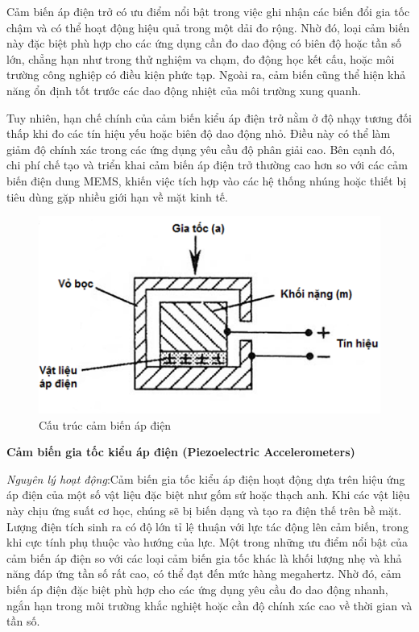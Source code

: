 Cảm biến áp điện trở có ưu điểm nổi bật trong việc ghi nhận các biến đổi gia tốc chậm và có thể hoạt động hiệu quả trong một dải đo rộng. Nhờ đó, loại cảm biến này đặc biệt phù hợp cho các ứng dụng cần đo dao động có biên độ hoặc tần số lớn, chẳng hạn như trong thử nghiệm va chạm, đo động học kết cấu, hoặc môi trường công nghiệp có điều kiện phức tạp. Ngoài ra, cảm biến cũng thể hiện khả năng ổn định tốt trước các dao động nhiệt của môi trường xung quanh.

Tuy nhiên, hạn chế chính của cảm biến kiểu áp điện trở nằm ở độ nhạy tương đối thấp khi đo các tín hiệu yếu hoặc biên độ dao động nhỏ. Điều này có thể làm giảm độ chính xác trong các ứng dụng yêu cầu độ phân giải cao. Bên cạnh đó, chi phí chế tạo và triển khai cảm biến áp điện trở thường cao hơn so với các cảm biến điện dung MEMS, khiến việc tích hợp vào các hệ thống nhúng hoặc thiết bị tiêu dùng gặp nhiều giới hạn về mặt kinh tế.

\begin{figure} [!]
		\centering
 		\includegraphics[width=\textwidth]{images/acce_apdien.png}
 		\vspace*{-7mm}
		\caption{Cấu trúc cảm biến áp điện}
		\label{acce_apdien}
  \FloatBarrier
\end{figure}

\textbf{Cảm biến gia tốc kiểu áp điện (Piezoelectric Accelerometers)}

\textit{Nguyên lý hoạt động}:Cảm biến gia tốc kiểu áp điện hoạt động dựa trên hiệu ứng áp điện của một số vật liệu đặc biệt như gốm sứ hoặc thạch anh. Khi các vật liệu này chịu ứng suất cơ học, chúng sẽ bị biến dạng và tạo ra điện thế trên bề mặt. Lượng điện tích sinh ra có độ lớn tỉ lệ thuận với lực tác động lên cảm biến, trong khi cực tính phụ thuộc vào hướng của lực. Một trong những ưu điểm nổi bật của cảm biến áp điện so với các loại cảm biến gia tốc khác là khối lượng nhẹ và khả năng đáp ứng tần số rất cao, có thể đạt đến mức hàng megahertz. Nhờ đó, cảm biến áp điện đặc biệt phù hợp cho các ứng dụng yêu cầu đo dao động nhanh, ngắn hạn trong môi trường khắc nghiệt hoặc cần độ chính xác cao về thời gian và tần số.

